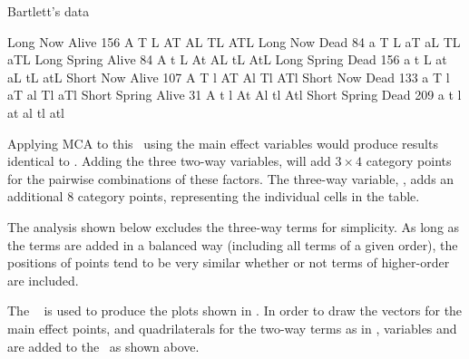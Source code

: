 \begin{Example}[bartlett]{Bartlett's data}
\begin{Output}[htb]
\begin{output}
   Long      Now       Alive     156     A    T    L    AT    AL    TL    ATL
   Long      Now       Dead       84     a    T    L    aT    aL    TL    aTL
   Long      Spring    Alive      84     A    t    L    At    AL    tL    AtL
   Long      Spring    Dead      156     a    t    L    at    aL    tL    atL
   Short     Now       Alive     107     A    T    l    AT    Al    Tl    ATl
   Short     Now       Dead      133     a    T    l    aT    al    Tl    aTl
   Short     Spring    Alive      31     A    t    l    At    Al    tl    Atl
   Short     Spring    Dead      209     a    t    l    at    al    tl    atl
\end{output}
\end{Output}

Applying MCA to this \Dset\ using the main effect variables 
would produce results identical to .
Adding the three two-way variables,  will add $3 \times 4$
category points for the pairwise combinations of these factors.
The three-way variable, , adds an additional
8 category points, representing the individual cells in the table.

The analysis shown below excludes the three-way  terms for simplicity.
As long as the terms are added in a balanced way
(including all terms of a given order), the positions of points tend to be very
similar whether or not terms of higher-order are included.


The \ODS\  is used to produce the plots
shown in .
In order to draw the vectors for the main effect points,
and quadrilaterals for the two-way terms
as in , variables  and 
are added to the  \Dset\ as shown above.


\end{Example}
